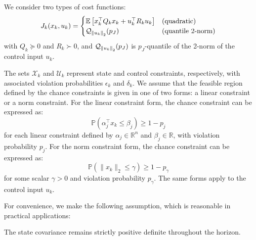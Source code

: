 \documentclass{IEEEtran}
\begin{document}
We consider two types of cost functions:
\begin{equation}
	J_k (x_k, u_k) = \begin{cases}
	\mathbb{E}\left[x_k^\top Q_k x_k + u_k^\top R_k u_k\right] & \text{(quadratic)} \\
	\mathcal{Q}_{\norm{u_k}_2}(p_J) & \text{(quantile 2-norm)}
	\end{cases}
\end{equation}
with \( Q_k \succeq 0 \) and \( R_k \succ 0 \), and \( \mathcal{Q}_{\norm{u_k}_2}(p_J) \) is $p_J$-quantile of the 2-norm of the control input $u_k$.

The sets \( \mathcal{X}_k \) and \( \mathcal{U}_k \) represent state and control constraints, respectively, with associated violation probabilities \( \epsilon_k \) and \( \delta_k \). We assume that the feasible region defined by the chance constraints is given in one of two forms: a linear constraint or a norm constraint. For the linear constraint form, the chance constraint can be expressed as:
\begin{equation} \label{eq:linear_chance_constraint}
	\mathbb{P}(\alpha_j ^\top x_k \leq \beta_j) \geq 1 - p_j
\end{equation}
for each linear constraint defined by \( \alpha_j \in \mathbb{R}^n \) and \( \beta_j \in \mathbb{R} \), with violation probability \( p_j \).
For the norm constraint form, the chance constraint can be expressed as:
\begin{equation} \label{eq:norm_chance_constraint}
	\mathbb{P}(\| x_k \|_2 \leq \gamma) \geq 1 - p_\gamma
\end{equation}
for some scalar \( \gamma > 0 \) and violation probability \( p_\gamma \). The same forms apply to the control input \( u_k \).

For convenience, we make the following assumption, which is reasonable in practical applications:
\begin{assumption} \label{assump:positive_definite_state}
	The state covariance remains strictly positive definite throughout the horizon.
\end{assumption}
\end{document}
